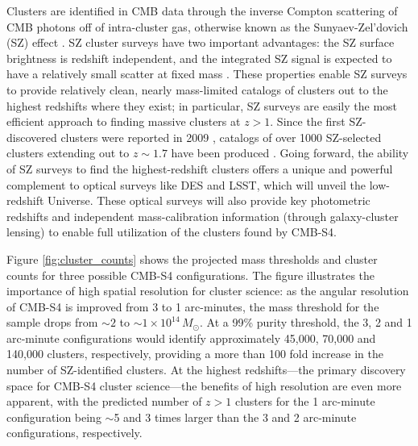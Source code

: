 Clusters are identified in CMB data through the inverse Compton scattering of CMB photons off of intra-cluster gas, otherwise known as the Sunyaev-Zel'dovich (SZ) effect \cite{Sunyaev:1972eq}. SZ cluster surveys have two important advantages: the SZ surface brightness is redshift independent, and the integrated SZ signal is expected to have a relatively small scatter at fixed mass \cite{Nagai:2005wx, Nagai:2007mt, Kravtsov:2012zs}. These properties enable SZ surveys to provide relatively clean, nearly mass-limited catalogs of clusters out to the highest redshifts where they exist; in particular, SZ surveys are easily the most efficient approach to finding massive clusters at $z > 1$. Since the first SZ-discovered clusters were reported in 2009 \cite{Staniszewski:2008ma}, catalogs of over 1000 SZ-selected clusters extending out to $z \sim 1.7$ have been produced \cite{Vanderlinde:2010eb, Reichardt:2012yj, Hasselfield:2013wf, Ade:2013skr, Bleem:2014iim, Ade:2015mva}. Going forward, the ability of SZ surveys to find the highest-redshift clusters offers a unique and powerful complement to optical surveys like DES and LSST, which will unveil the low-redshift Universe. These optical surveys will also provide key photometric redshifts and independent mass-calibration information (through galaxy-cluster lensing) to enable full utilization of the clusters found by CMB-S4.

Figure \ref{fig:cluster_counts} shows the projected mass thresholds and cluster counts for three possible CMB-S4 configurations. The figure illustrates the importance of high spatial resolution for cluster science: as the angular resolution of CMB-S4 is improved from 3 to 1 arc-minutes, the mass threshold for the sample drops from $\sim2$ to $\sim1\times 10^{14}\,M_{\odot}$. At a 99\% purity threshold, the 3, 2 and 1 arc-minute configurations would identify approximately 45,000, 70,000 and 140,000 clusters, respectively, providing a more than 100 fold increase in the number of SZ-identified clusters.  At the highest redshifts---the primary discovery space for CMB-S4 cluster science---the benefits of high resolution are even more apparent, with the predicted number of $z>1$ clusters for the 1 arc-minute configuration being $\sim$5 and 3 times larger than the 3 and 2 arc-minute configurations, respectively. 


